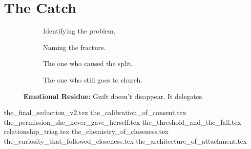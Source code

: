 
\section{The Catch}

\vfill

\begin{figure}[H]
    \centering

    \begin{subfigure}[t]{0.45\textwidth}
    \centering
    \caption*{Identifying the problem.}
    \end{subfigure}
    \hfill
    \begin{subfigure}[t]{0.45\textwidth}
    \centering
    \caption*{Naming the fracture.}
    \end{subfigure}

    \vspace{1em}

    \begin{subfigure}[t]{0.45\textwidth}
    \centering
    \caption*{The one who caused the split.}
    \end{subfigure}
    \hfill
    \begin{subfigure}[t]{0.45\textwidth}
    \centering
    \caption*{The one who still goes to church.}
    \end{subfigure}

    \caption*{\textbf{Emotional Residue:} Guilt doesn't disappear. It delegates.}
\end{figure}


{the_final_seduction_v2.tex}
{the_calibration_of_consent.tex}
{the_permission_she_never_gave_herself.tex}
{the_threshold_and_the_fall.tex}
{relationship_triag.tex}
{the_chemistry_of_closeness.tex}
{the_curiosity_that_followed_closeness.tex}
{the_architecture_of_attachment.tex}